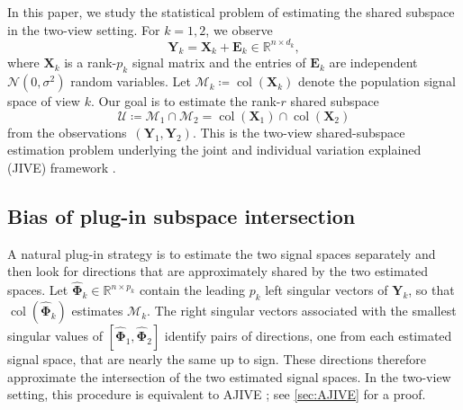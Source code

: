 \documentclass[11pt]{article}
\newcommand{\cU}{\mathcal{U}}
\newcommand{\cM}{\mathcal{M}}
\begin{document}
In this paper, we study the statistical problem of estimating the shared subspace in the
two-view setting. For $k=1,2$, we observe
\begin{equation}
\label{eq:JIVE-intro}
  \bm Y_k=\bm X_k+\bm E_k\in\mathbb R^{n\times d_k},
\end{equation}
where $\bm X_k$ is a rank-$p_k$ signal matrix and the entries of $\bm E_k$
are independent $\mathcal N(0,\sigma^2)$ random variables. Let
$\cM_k\coloneqq\operatorname{col}(\bm X_k)$ denote the population signal
space of view $k$. Our goal is to estimate the rank-$r$ shared subspace
\begin{equation}
\label{eq:target-intro}
  \cU
  \coloneqq
  \cM_1\cap\cM_2
  =
  \operatorname{col}(\bm X_1)\cap\operatorname{col}(\bm X_2)
\end{equation}
from the observations~$(\bm Y_1,\bm Y_2)$. This is the two-view shared-subspace estimation problem 
underlying the joint and individual variation explained (JIVE) framework \citep{lock2013joint}.

\subsection{Bias of plug-in subspace intersection}
\label{sec:ajive-bias}


A natural plug-in strategy is to estimate the two signal spaces separately and then look for directions that are approximately shared by the two estimated spaces. Let $\widehat{\bm\Phi}_k\in\mathbb R^{n\times p_k}$ contain the leading $p_k$ left singular vectors of $\bm Y_k$, so that $\operatorname{col}(\widehat{\bm\Phi}_k)$ estimates $\cM_k$. The right singular vectors associated with the smallest singular values of  $[\widehat{\bm\Phi}_1,\widehat{\bm\Phi}_2]$ identify pairs of directions, one from each estimated signal space, that are nearly the same up to sign. These directions therefore approximate the intersection of the two estimated signal spaces. In the two-view setting, this procedure is equivalent to AJIVE
\citep{Feng2018,yang2025estimating,sergazinov2026spectral}; see
\cref{sec:AJIVE} for a proof. 
\end{document}
